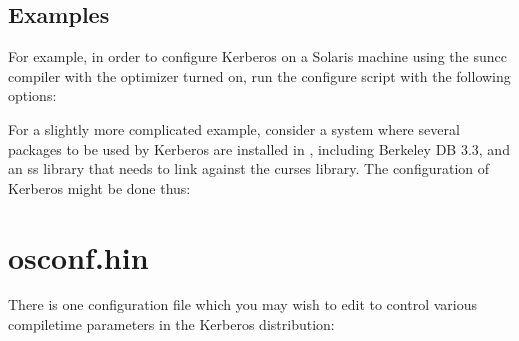 \documentclass[letterpaper,10pt,english]{sphinxmanual}
\begin{document}
\subsection{Examples}
\label{\detokenize{build/options2configure:examples}}
\sphinxAtStartPar
For example, in order to configure Kerberos on a Solaris machine using
the suncc compiler with the optimizer turned on, run the configure
script with the following options:

\begin{sphinxVerbatim}[commandchars=\\\{\}]
   
\end{sphinxVerbatim}

\sphinxAtStartPar
For a slightly more complicated example, consider a system where
several packages to be used by Kerberos are installed in
, including Berkeley DB 3.3, and an ss library that
needs to link against the curses library.  The configuration of
Kerberos might be done thus:

\begin{sphinxVerbatim}[commandchars=\\\{\}]
   \PYGZbs{}
    \PYGZbs{}
   
\end{sphinxVerbatim}


\section{osconf.hin}
\label{\detokenize{build/osconf:osconf-hin}}\label{\detokenize{build/osconf::doc}}
\sphinxAtStartPar
There is one configuration file which you may wish to edit to control
various compile\sphinxhyphen{}time parameters in the Kerberos distribution:
\end{document}
